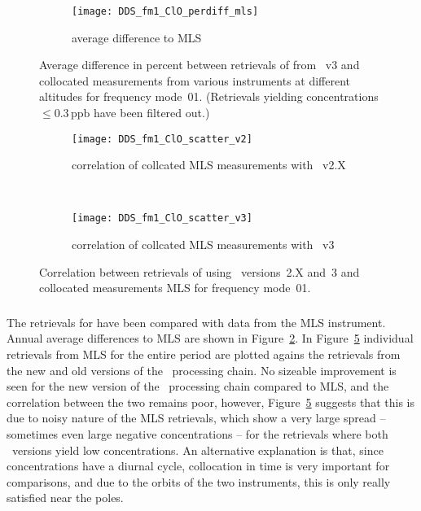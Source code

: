 
\begin{figure}[htpb]
    \centering
    \begin{subfigure}[b]{0.49\textwidth}
        \texttt{[image: DDS\_fm1\_ClO\_perdiff\_mls]}
        \caption{average difference to MLS}
        \label{fig:fm01:ClO:profiles:MLS}
    \end{subfigure}
    \caption{Average difference in percent between retrievals of 
    from \smr~v3 and collocated measurements from various instruments at
    different altitudes for frequency mode~01. (Retrievals yielding
    concentrations $\leq 0.3\,\mathrm{ppb}$ have been filtered out.)}
    \label{fig:fm01:ClO:profiles}
\end{figure}

\begin{figure}[htpb]
    \centering
    \begin{subfigure}[b]{0.49\textwidth}
        \texttt{[image: DDS\_fm1\_ClO\_scatter\_v2]}
        \caption{correlation of collcated MLS measurements with \smr~v2.X}
        \label{fig:fm01:ClO:scatter:v2}
    \end{subfigure}
    \,
    \begin{subfigure}[b]{0.49\textwidth}
        \texttt{[image: DDS\_fm1\_ClO\_scatter\_v3]}
        \caption{correlation of collcated MLS measurements with \smr~v3}
        \label{fig:fm01:ClO:scatter:v3}
    \end{subfigure}
    \caption{Correlation between retrievals of  using \smr\
    versions~2.X and~3 and collocated measurements MLS for frequency mode~01.}
    \label{fig:fm01:ClO:scatter}
\end{figure}

\subsubsection{}
\label{sec:fm01:comparison:ClO}
The retrievals for \chem{ClO} have been compared with data from the MLS
instrument. Annual average differences to MLS are shown in
Figure~\ref{fig:fm01:ClO:profiles}. In Figure~\ref{fig:fm01:ClO:scatter}
individual retrievals from MLS for the entire period are plotted agains the
retrievals from the new and old versions of the \smr\ processing chain. No
sizeable improvement is seen for the new version of the \smr\ processing chain
compared to MLS, and the correlation between the two remains poor, however,
Figure~\ref{fig:fm01:ClO:scatter} suggests that this is due to noisy nature of
the MLS retrievals, which show a very large spread -- sometimes even large
negative concentrations -- for the retrievals where both \smr\ versions yield
low  concentrations. An alternative explanation is that, since
\chem{ClO} concentrations have a diurnal cycle, collocation in time is very
important for comparisons, and due to the orbits of the two instruments, this
is only really satisfied near the poles.



